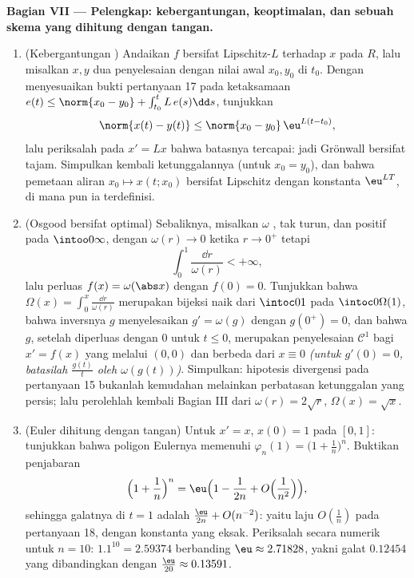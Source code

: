 \begin{problem}[{Soal akhir pekan --- keberadaan penyelesaian
$x' = f(t, x)$ tanpa Lipschitz}]
\medskip
\noindent\textbf{Bagian VII --- Pelengkap: kebergantungan,
keoptimalan, dan sebuah skema yang dihitung dengan tangan.}
\begin{enumerate}[resume]
  \item (Kebergantungan ) Andaikan $f$ bersifat Lipschitz-$L$
        terhadap $x$ pada $R$, lalu misalkan $x, y$ dua penyelesaian dengan
        nilai awal $x_0, y_0$ di $t_0$. Dengan menyesuaikan bukti
        pertanyaan 17 pada ketaksamaan $e(t) \leq \norm{x_0
        - y_0} + \int_{t_0}^tL\,e(s)\dd s$, tunjukkan
        \[
        \norm{x(t) - y(t)} \leq \norm{x_0 - y_0}\,
        \eu^{L(t - t_0)},
        \]
        lalu periksalah pada $x' = Lx$ bahwa batasnya tercapai: jadi
        Grönwall bersifat tajam. Simpulkan kembali ketunggalannya (untuk $x_0 =
        y_0$), dan bahwa pemetaan aliran $x_0 \mapsto x(t; x_0)$
        bersifat Lipschitz dengan konstanta $\eu^{LT}$, di mana pun ia
        terdefinisi.
  \item (Osgood bersifat optimal) Sebaliknya, misalkan $\omega$
        , tak turun, dan positif pada
        $\intoo0\infty$, dengan $\omega(r) \to 0$ ketika $r \to 0^+$
        tetapi
        \[
        \int_0^1\frac{\dd r}{\omega(r)} < +\infty,
        \]
        lalu perluas $f(x) = \omega(\abs x)$ dengan $f(0) = 0$.
        Tunjukkan bahwa $\Omega(x) = \int_0^x\frac{\dd r}{\omega(r)}$
        merupakan bijeksi naik dari $\intoc0{1}$ pada
        $\intoc0{\Omega(1)}$, bahwa inversnya $g$ menyelesaikan $g'
        = \omega(g)$ dengan $g(0^+) = 0$, dan bahwa $g$, setelah diperluas
        dengan $0$ untuk $t \leq 0$, merupakan penyelesaian $\mathcal C^1$ bagi
        $x' = f(x)$ yang melalui $(0, 0)$ dan berbeda dari $x \equiv
        0$ \emph{(untuk $g'(0) = 0$, batasilah $\frac{g(t)}t$ oleh
        $\omega(g(t))$)}. Simpulkan: hipotesis divergensi
        pada pertanyaan 15 bukanlah kemudahan melainkan perbatasan
        ketunggalan yang persis; lalu perolehlah kembali Bagian III dari
        $\omega(r) = 2\sqrt r$, $\Omega(x) = \sqrt x$.
  \item (Euler dihitung dengan tangan) Untuk $x' = x$, $x(0) = 1$ pada
        $[0, 1]$: tunjukkan bahwa poligon Eulernya memenuhi
        $\varphi_n(1) = \bigl(1 + \frac1n\bigr)^n$. Buktikan
        penjabaran
        \[
        \Bigl(1 + \frac1n\Bigr)^{n}
        = \eu\Bigl(1 - \frac1{2n} + O\Bigl(\frac1{n^2}\Bigr)
        \Bigr),
        \]
        sehingga galatnya di $t = 1$ adalah $\frac{\eu}{2n} +
        O(n^{-2})$: yaitu laju $O(\frac1n)$ pada pertanyaan 18, dengan
        konstanta yang eksak. Periksalah secara numerik untuk $n = 10$:
        $1.1^{10} = 2.59374$ berbanding $\eu \approx 2.71828$,
        yakni galat $0.12454$ yang dibandingkan dengan $\frac{\eu}{20}
        \approx 0.13591$.

\end{enumerate}
\end{problem}
